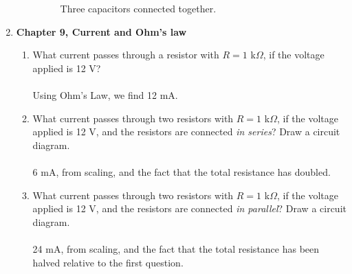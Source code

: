 \documentclass[10pt]{article}
\begin{document}
\begin{enumerate}
\begin{enumerate}
\begin{figure}
\caption{\label{fig:c1} Three capacitors connected together.}
\end{figure}
\end{enumerate}
\item \textbf{Chapter 9, Current and Ohm's law}
\begin{enumerate}
\item What current passes through a resistor with $R=1$ k$\Omega$, if the voltage applied is 12 V? \\ \\
Using Ohm's Law, we find 12 mA.
\\
\item What current passes through two resistors with $R=1$ k$\Omega$, if the voltage applied is 12 V, and the resistors are connected \textit{in series}? Draw a circuit diagram. \\ \\
6 mA, from scaling, and the fact that the total resistance has doubled.
\\
\item What current passes through two resistors with $R=1$ k$\Omega$, if the voltage applied is 12 V, and the resistors are connected \textit{in parallel}? Draw a circuit diagram. \\ \\
24 mA, from scaling, and the fact that the total resistance has been halved relative to the first question.
\end{enumerate}
\end{enumerate}
\end{document}
